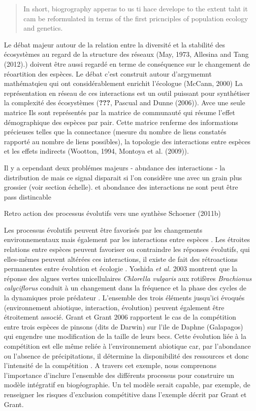 \begin{quote}
\guillemotleft In short, biogrography apperas to us ti hace develope to
the extent taht it cam be reformulated in terms of the first pricnciples
of population ecology and genetics. \guillemotright
\end{quote}

Le débat majeur autour de la relation entre la diversité et la stabilité
des écosystèmes au regard de la structure des réseaux (May, 1973,
Allesina and Tang (2012).) doivent être aussi regardé en terme de
conséquence sur le changement de réoartition des espèces. Le débat c'est
construit autour d'argymemnt mathématqieu qui ont considérablement
enrichit l'écologue (McCann, 2000) La représentation en réseau de ces
interactions est un outil puissant pour synthétiser la complexité des
écosystèmes ({\textbf{???}}, Pascual and Dunne (2006)). Avce une seule
matrice Ils sont représentés par la matrice de communauté qui résume
l'effet démographique des espèces par pair. Cette matrice renferme des
informations précieuses telles que la connectance (mesure du nombre de
liens constatés rapporté au nombre de liens possibles), la topologie des
interactions entre espèces \cite{Sole2006} et les effets indirects
(Wootton, 1994, Montoya et al. (2009)).

Il y a cependant deux problémes majeurs - abndance des interactions - la
distribution de mais ce signal disparait si l'on considère une avec un
grain plus grossier (voir section échelle). et abondance des
interactions ne sont peut être pass distincable

Retro action des processus évolutifs vers une synthèse Schoener (2011b)

Les processus évolutifs peuvent être favorisés par les changements
environnementaux mais également par les interactions entre espèces
\cite{Tingley2009}. Les étroites relations entre espèces peuvent
favoriser ou contraindre les réponses évolutifs, qui elles-mêmes peuvent
altérées ces interactions, il existe de fait des rétroactions
permanentes entre évolution et écologie \cite{Post2009}. Yoshida
\textit{et al.} 2003 montrent que la réponse des algues vertes
unicellulaires \textit{Chlorella vulgaris} aux rotifères
\textit{Brachionus calyciflorus} conduit à un changement dans la
fréquence et la phase des cycles de la dynamiques proie prédateur
\cite{Yoshida2003}. L'ensemble des trois éléments jusqu'ici évoqués
(environnement abiotique, interaction, évolution) peuvent également être
étroitement associé. Grant et Grant 2006 rapportent le cas de la
compétition entre trois espèces de pinsons (dits de Darwin) sur l'ile de
Daphne (Galapagos) qui engendre une modification de la taille de leurs
becs. Cette évolution liée à la compétition est elle même reliée à
l'environnement abiotique car, par l'abondance ou l'absence de
précipitations, il détermine la disponibilité des ressources et donc
l'intensité de la compétition \cite{Grant2006}. A travers cet exemple,
nous comprenons l'importance d'inclure l'ensemble des différents
processus pour construire un modèle intégratif en biogéographie. Un tel
modèle serait capable, par exemple, de renseigner les risques
d'exclusion compétitive dans l'exemple décrit par Grant et Grant.

